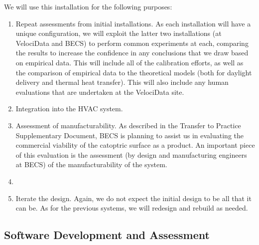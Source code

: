 
We will use this installation for the following purposes:

\begin{enumerate}

\item Repeat assessments from initial installations.
As each installation will have a unique configuration, we will exploit the
latter two installations (at VelociData and BECS) to perform common
experiments at each, comparing the results to increase the confidence
in any conclusions that we draw based on empirical data.
This will include all of the calibration efforts, as well as the comparison
of empirical data to the theoretical models (both for daylight delivery
and thermal heat transfer).
This will also include any human evaluations that are undertaken at
the VelociData site.

\item Integration into the HVAC system.

\item Assessment of manufacturability.
As described in the Transfer to Practice Supplementary Document, BECS
is planning to assist us in evaluating the commercial viability of the
catoptric surface as a product.  An important piece of this evaluation is
the assessment (by design and manufacturing engineers at BECS) of the
manufacturability of the system.

\item {}

\item Iterate the design. Again, we do not expect the initial design
to be all that it can be. As for the previous systems, we will redesign
and rebuild as needed.

\end{enumerate}

\subsection{Software Development and Assessment}

